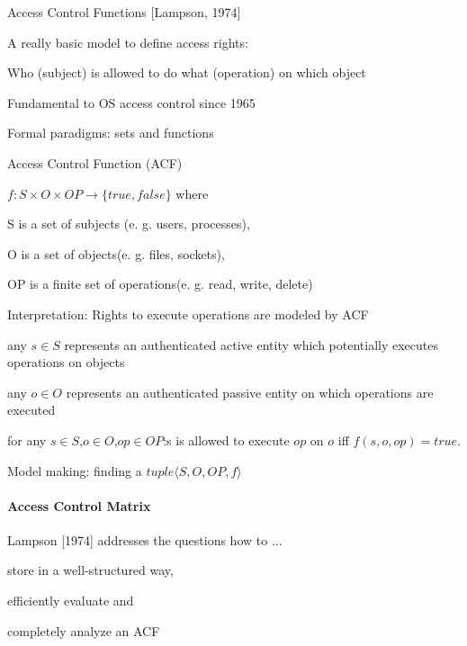 \documentclass[a4paper]{article}
\begin{document}
\begin{multicols}{3}
    Access Control Functions [Lampson, 1974]
    \begin{itemize*}
        \item A really basic model to define access rights:
        \begin{itemize*}
            \item Who (subject) is allowed to do what (operation) on which object
            \item Fundamental to OS access control since 1965
            \item Formal paradigms: sets and functions
        \end{itemize*}
        \item Access Control Function (ACF)
        \begin{itemize*}
            \item $f:S \times O \times OP \rightarrow \{true,false\}$ where
            \item S is a set of subjects (e. g. users, processes),
            \item O is a set of objects(e. g. files, sockets),
            \item OP is a finite set of operations(e. g. read, write, delete)
        \end{itemize*}
        \item Interpretation: Rights to execute operations are modeled by ACF
        \begin{itemize*}
            \item any $s\in S$ represents an authenticated active entity which potentially executes operations on objects
            \item any $o\in O$ represents an authenticated passive entity on which operations are executed
            \item for any $s\in S$,$o\in O$,$op\in OP$:s is allowed to execute $op$ on $o$ iff $f(s,o,op)=true$.
            \item Model making: finding a $tuple⟨S,O,OP,f⟩$
        \end{itemize*}
    \end{itemize*}

    \paragraph{Access Control Matrix}
    Lampson [1974] addresses the questions how to ...
    \begin{itemize*}
        \item store in a well-structured way,
        \item efficiently evaluate and
        \item completely analyze an ACF
    \end{itemize*}


\end{multicols}
\end{document}
